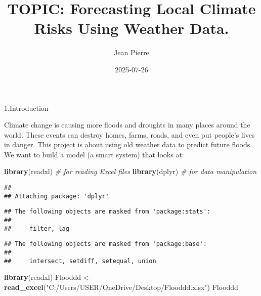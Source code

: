 \documentclass[
]{article}
\title{TOPIC: Forecasting Local Climate Risks Using Weather Data.}
\author{Jean Pierre}
\date{2025-07-26}
\newenvironment{Shaded}{\begin{snugshade}}{\end{snugshade}}
\newcommand{\CommentTok}[1]{\textcolor[rgb]{0.56,0.35,0.01}{\textit{#1}}}
\newcommand{\FunctionTok}[1]{\textcolor[rgb]{0.13,0.29,0.53}{\textbf{#1}}}
\newcommand{\NormalTok}[1]{#1}
\newcommand{\OtherTok}[1]{\textcolor[rgb]{0.56,0.35,0.01}{#1}}
\newcommand{\StringTok}[1]{\textcolor[rgb]{0.31,0.60,0.02}{#1}}
\begin{document}
\maketitle

1.Introduction

Climate change is causing more floods and droughts in many places around
the world. These events can destroy homes, farms, roads, and even put
people's lives in danger. This project is about using old weather data
to predict future floods. We want to build a model (a smart system) that
looks at:

\begin{Shaded}
\begin{Highlighting}[]
\FunctionTok{library}\NormalTok{(readxl)    }\CommentTok{\# for reading Excel files}
\FunctionTok{library}\NormalTok{(dplyr)     }\CommentTok{\# for data manipulation}
\end{Highlighting}
\end{Shaded}

\begin{verbatim}
## 
## Attaching package: 'dplyr'
\end{verbatim}

\begin{verbatim}
## The following objects are masked from 'package:stats':
## 
##     filter, lag
\end{verbatim}

\begin{verbatim}
## The following objects are masked from 'package:base':
## 
##     intersect, setdiff, setequal, union
\end{verbatim}

\begin{Shaded}
\begin{Highlighting}[]
\FunctionTok{library}\NormalTok{(readxl)}
\NormalTok{Flooddd }\OtherTok{\textless{}{-}} \FunctionTok{read\_excel}\NormalTok{(}\StringTok{"C:/Users/USER/OneDrive/Desktop/Flooddd.xlsx"}\NormalTok{)}
\NormalTok{Flooddd}
\end{Highlighting}
\end{Shaded}
\end{document}
